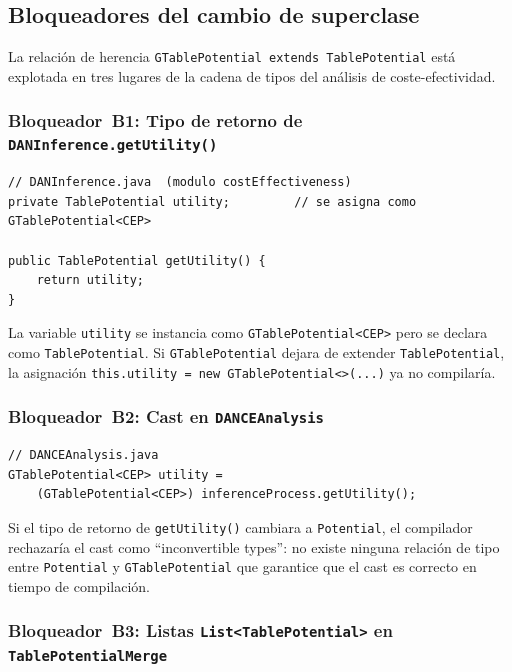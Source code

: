\documentclass[11pt,a4paper]{article}
\newcommand{\code}[1]{\texttt{#1}}
\begin{document}
\subsection{Bloqueadores del cambio de superclase}
\label{sec:gtable-bloqueadores}

La relación de herencia \code{GTablePotential extends TablePotential} está
explotada en tres lugares de la cadena de tipos del análisis de
coste-efectividad.

\subsubsection{Bloqueador~B1: Tipo de retorno de \code{DANInference.getUtility()}}

\begin{lstlisting}[caption={Campo y método afectados en \code{DANInference}}]
// DANInference.java  (modulo costEffectiveness)
private TablePotential utility;         // se asigna como GTablePotential<CEP>

public TablePotential getUtility() {
    return utility;
}
\end{lstlisting}

La variable \code{utility} se instancia como \code{GTablePotential<CEP>} pero
se declara como \code{TablePotential}.  Si \code{GTablePotential} dejara de
extender \code{TablePotential}, la asignación
\code{this.utility = new GTablePotential<>(...)} ya no compilaría.

\subsubsection{Bloqueador~B2: Cast en \code{DANCEAnalysis}}

\begin{lstlisting}[caption={Cast a \code{GTablePotential} en \code{DANCEAnalysis}}]
// DANCEAnalysis.java
GTablePotential<CEP> utility =
    (GTablePotential<CEP>) inferenceProcess.getUtility();
\end{lstlisting}

Si el tipo de retorno de \code{getUtility()} cambiara a \code{Potential},
el compilador rechazaría el cast como ``inconvertible types'': no existe
ninguna relación de tipo entre \code{Potential} y \code{GTablePotential}
que garantice que el cast es correcto en tiempo de compilación.

\subsubsection{Bloqueador~B3: Listas \code{List<TablePotential>} en \code{TablePotentialMerge}}
\end{document}
